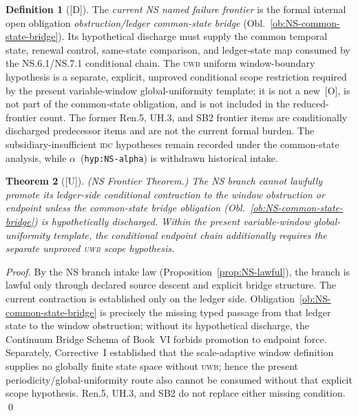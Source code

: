 \documentclass[12pt,oneside]{amsbook}
\theoremstyle{plain}
\newtheorem{theorem}{Theorem}[section]
\theoremstyle{definition}
\newtheorem{definition}[theorem]{Definition}
\theoremstyle{remark}
\newcommand{\status}[1]{\textup{[#1]}}
\begin{document}
\begin{definition}[\status{D}]\label{def:NS-frontier}
The \emph{current NS named failure frontier} is the formal internal
open obligation \emph{obstruction/ledger common-state bridge}
(Obl.~\ref{ob:NS-common-state-bridge}). Its hypothetical discharge
must supply the common temporal state, renewal control, same-state
comparison, and ledger-state map consumed by the NS.6.1/NS.7.1
conditional chain. The \textsc{uwb} uniform window-boundary
hypothesis is a separate, explicit, unproved conditional scope
restriction required by the present variable-window
global-uniformity template; it is not a new~[O], is not part of the
common-state obligation, and is not included in the reduced-frontier
count. The former Ren.5, UH.3, and SB2 frontier items are
conditionally discharged predecessor items and are not the current
formal burden. The subsidiary-insufficient \textsc{idc} hypotheses
remain recorded under the common-state analysis, while
$\alpha$~(\texttt{hyp:NS-alpha}) is withdrawn historical intake.
\end{definition}

\begin{theorem}[\status{U}]\label{thm:NS-frontier}
\textup{(NS Frontier Theorem.)} The NS branch cannot lawfully
promote its ledger-side conditional contraction to the window
obstruction or endpoint unless the common-state bridge obligation
(Obl.~\ref{ob:NS-common-state-bridge}) is hypothetically discharged.
Within the present variable-window global-uniformity template, the
conditional endpoint chain additionally requires the separate
unproved \textsc{uwb} scope hypothesis.
\end{theorem}

\begin{proof}
By the NS branch intake law (Proposition~\ref{prop:NS-lawful}), the
branch is lawful only through declared source descent and explicit
bridge structure. The current contraction is established only on the
ledger side. Obligation~\ref{ob:NS-common-state-bridge} is precisely
the missing typed passage from that ledger state to the window
obstruction; without its hypothetical discharge, the Continuum
Bridge Schema of Book~VI forbids promotion to endpoint force.
Separately, Corrective~I established that the scale-adaptive window
definition supplies no globally finite state space without
\textsc{uwb}; hence the present periodicity/global-uniformity route
also cannot be consumed without that explicit scope hypothesis.
Ren.5, UH.3, and SB2 do not replace either missing condition.
\qed
\end{proof}
\end{document}
